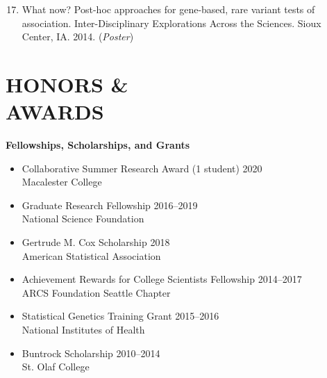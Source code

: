 \documentclass[margin]{res}
\newenvironment{benumerate}[1]{
    \let\oldItem\item
    \def\item{\addtocounter{enumi}{-2}\oldItem}
    
    \begin{enumerate}
    \setcounter{enumi}{#1}
    \addtocounter{enumi}{1}
}{
    \end{enumerate}
}
\begin{document}
\begin{resume}
\begin{benumerate}{16}
\item %
What now? Post-hoc approaches for gene-based, rare variant tests of association. Inter-Disciplinary Explorations Across the Sciences. Sioux Center, IA. 2014.  (\textit{Poster})\\
\end{benumerate}


\section{HONORS \& \\ AWARDS}

\textbf{Fellowships, Scholarships, and Grants}
\begin{itemize}
\item Collaborative Summer Research Award (1 student) \hfill 2020 \\
Macalester College
\item Graduate Research Fellowship \hfill 2016--2019 \\
National Science Foundation  
\item Gertrude M. Cox Scholarship \hfill 2018 \\ American Statistical Association
\item Achievement Rewards for College Scientists Fellowship \hfill 2014--2017 \\
ARCS Foundation Seattle Chapter
\item Statistical Genetics Training Grant \hfill 2015--2016  \\
National Institutes of Health 
\item Buntrock Scholarship \hfill 2010--2014 \\ St. Olaf College \\
\end{itemize}


\end{resume}
\end{document}
